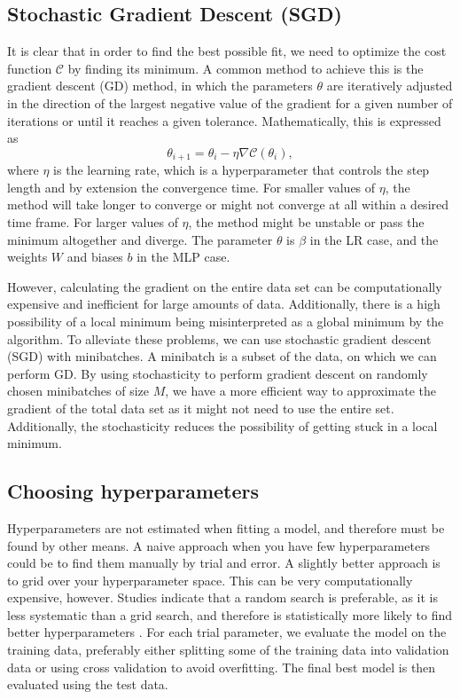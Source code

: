 \documentclass[a4paper, 11pt, twocolumn]{article}
\begin{document}
\subsection{Stochastic Gradient Descent (SGD)}
\label{SGD}
It is clear that in order to find the best possible fit, we need to optimize the
cost function $\mathcal{C}$ by finding its minimum. A common method to achieve
this is the gradient descent (GD) method, in which the parameters $\theta$ are
iteratively adjusted in the direction of the largest negative value of the
gradient for a given number of iterations or until it reaches a given tolerance.
Mathematically, this is expressed as
\begin{equation}
\theta_{i+1} = \theta_i -\eta \nabla \mathcal{C}(\theta_i),
\end{equation}
where $\eta$ is the learning rate, which is a hyperparameter that controls the
step length and by extension the convergence time. For smaller values of $\eta$,
the method will take longer to converge or might not converge at all within a
desired time frame. For larger values of $\eta$, the method might be unstable or
pass the minimum altogether and diverge. The parameter $\theta$ is $\beta$ in
the LR case, and the weights $W$ and biases $b$ in the MLP case.

However, calculating the gradient on the entire data set can be computationally
expensive and inefficient for large amounts of data. Additionally, there is a high
possibility of a local minimum being misinterpreted as a global minimum by the
algorithm. To alleviate these problems, we can use stochastic gradient descent
(SGD) with minibatches.  A minibatch is a subset of the data, on which we can
perform GD. By using stochasticity to perform gradient descent on randomly chosen
minibatches of size $M$, we have a more efficient way to approximate the gradient
of the total data set as it might not need to use the entire set. Additionally,
the stochasticity reduces the possibility of getting stuck in a local minimum.

\subsection{Choosing hyperparameters}
Hyperparameters are not estimated when fitting a model, and therefore must be
found by other means. A naive approach when you have few hyperparameters could
be to find them manually by trial and error. A slightly better approach is to
grid over your hyperparameter space. This can be very computationally expensive,
however. Studies indicate that a random search is preferable, as it is less
systematic than a grid search, and therefore is statistically more likely to
find better hyperparameters  \cite{bergstra2012random}. For each trial parameter,
we evaluate the model on the training data, preferably either splitting some of
the training data into validation data or using cross validation to avoid overfitting.
The final best model is then evaluated using the test data.
\end{document}
